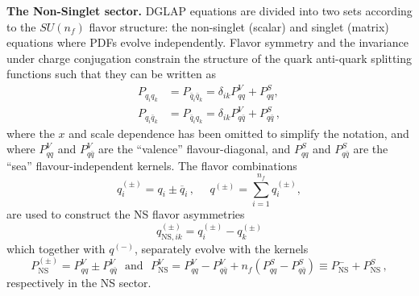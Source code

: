 \documentclass[12pt,notitlepage,aps,preprintnumbers,superscriptaddress,nofootinbib,aps,prd,floatfix]{revtex4-2}
\begin{document}
{\bf The Non-Singlet sector.} DGLAP equations are divided into two sets according to the $SU(n_f)$ flavor structure: the non-singlet (scalar) and singlet (matrix) equations where PDFs evolve independently. Flavor symmetry and the invariance under charge conjugation constrain the structure of the quark anti-quark splitting functions such that they can be written as
%
\begin{align}
  P_{q_iq_k} &= P_{\bar{q}_i\bar{q}_k} = \delta_{ik} P_{qq}^V + P_{qq}^S, \\
  P_{q_i\bar{q}_k} &= P_{\bar{q}_iq_k} = \delta_{ik}P_{q\bar{q}}^V + P_{q\bar{q}}^S\,,
\end{align}
%
where the $x$ and scale dependence has been omitted to simplify the notation, and where $P_{qq}^V$ and $P_{q\bar{q}}^V$ are the ``valence'' flavour-diagonal, and $P_{qq}^S$ and $P_{q\bar{q}}^S$ are the ``sea'' flavour-independent kernels. The flavor combinations
%
\begin{equation}
q_{i}^{(\pm)}=q_{i}\pm\overline{q}_{i}\,,
~~~~~~q^{(\pm)}=\sum_{i=1}^{n_{f}}q_{i}^{(\pm)},
\label{NS-S-comb}
\end{equation}
%
are used to construct the NS flavor asymmetries 
%
\begin{equation}
q_{\mathrm{NS},ik}^{(\pm)} = q_i^{(\pm)} -q_k^{(\pm)}
\end{equation}
%
which together with $q^{(-)}$, separately evolve with the kernels 
%
\begin{equation}
P_{\mathrm{NS}}^{(\pm)} = P_{qq}^V \pm P_{q\bar{q}}^V
~~~\textrm{and} ~~~
P_{\mathrm{NS}}^V = P_{qq}^V - P_{q\bar{q}}^V + n_f(P_{qq}^S - P_{q\bar{q}}^S) \equiv P_{\mathrm{NS}}^- + P_{\mathrm{NS}}^S\,,
\end{equation}
respectively in the NS sector. 
\end{document}
